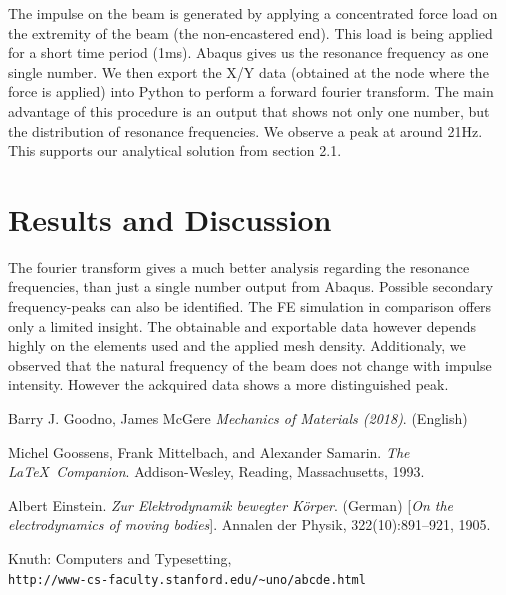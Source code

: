 \documentclass[12pt]{article}
\begin{document}
\noindent The impulse on the beam is generated by applying a concentrated force load on the extremity of 
the beam (the non-encastered end).
This load is being applied for a short time period (1ms). Abaqus gives us the resonance frequency as one single number. 
We then export the X/Y data (obtained at the node where the force is applied) 
into Python to perform a forward fourier transform.
The main advantage of this procedure is an output that shows not only one number, 
but the distribution of resonance frequencies. We observe a peak at around 21Hz. 
This supports our analytical solution from section 2.1.


\section{Results and Discussion}

The fourier transform gives a much better analysis regarding the resonance frequencies,
than just a single number output from Abaqus. 
Possible secondary frequency-peaks can also be identified. The FE simulation in comparison offers 
only a limited insight. The obtainable and exportable data however depends highly on the
elements used and the applied mesh density.
Additionaly, we observed that the natural frequency of the beam does not change with impulse intensity\cite{natural frequencies}.
However the ackquired data shows a more distinguished peak. 


\pagebreak
\begin{thebibliography}{9}

  
  Barry J. Goodno, James McGere
  \textit{Mechanics of Materials (2018)}. (English)  

  Michel Goossens, Frank Mittelbach, and Alexander Samarin. 
  \textit{The \LaTeX\ Companion}. 
  Addison-Wesley, Reading, Massachusetts, 1993.
   
  Albert Einstein. 
  \textit{Zur Elektrodynamik bewegter K{\"o}rper}. (German) 
  [\textit{On the electrodynamics of moving bodies}]. 
  Annalen der Physik, 322(10):891–921, 1905.
   
  Knuth: Computers and Typesetting,
  \\\texttt{http://www-cs-faculty.stanford.edu/\~{}uno/abcde.html}
\end{thebibliography}
\end{document}
